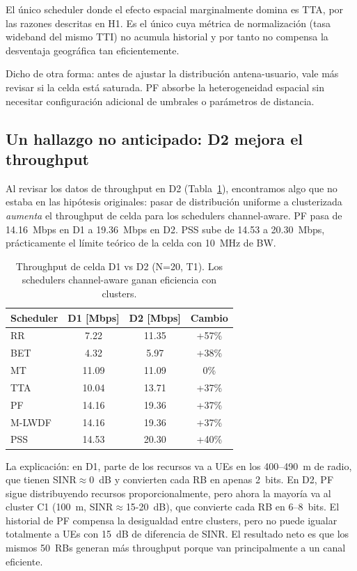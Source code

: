 \documentclass[conference]{IEEEtran}
\begin{document}
El único scheduler donde el efecto espacial marginalmente domina es TTA, por las
razones descritas en H1. Es el único cuya métrica de normalización (tasa wideband del
mismo TTI) no acumula historial y por tanto no compensa la desventaja geográfica tan
eficientemente.

Dicho de otra forma: antes de ajustar la distribución antena-usuario, vale más revisar
si la celda está saturada. PF absorbe la heterogeneidad espacial sin necesitar
configuración adicional de umbrales o parámetros de distancia.

\subsection{Un hallazgo no anticipado: D2 mejora el throughput}

Al revisar los datos de throughput en D2 (Tabla~\ref{tab:tput_d2}), encontramos algo
que no estaba en las hipótesis originales: pasar de distribución uniforme a clusterizada
\emph{aumenta} el throughput de celda para los schedulers channel-aware. PF pasa de
14.16~Mbps en D1 a 19.36~Mbps en D2. PSS sube de 14.53 a 20.30~Mbps, prácticamente
el límite teórico de la celda con 10~MHz de BW.

\begin{table}[t]
  \centering
  \caption{Throughput de celda D1 vs D2 (N=20, T1). Los schedulers channel-aware
           ganan eficiencia con clusters.}
  \label{tab:tput_d2}
  \footnotesize
  \begin{tabular}{@{}lccc@{}}
    \toprule
    \textbf{Scheduler} & \textbf{D1 [Mbps]} & \textbf{D2 [Mbps]} & \textbf{Cambio} \\
    \midrule
    RR     & 7.22  & 11.35 & +57\% \\
    BET    & 4.32  & 5.97  & +38\% \\
    MT     & 11.09 & 11.09 &   0\% \\
    TTA    & 10.04 & 13.71 & +37\% \\
    PF     & 14.16 & 19.36 & +37\% \\
    M-LWDF & 14.16 & 19.36 & +37\% \\
    PSS    & 14.53 & 20.30 & +40\% \\
    \bottomrule
  \end{tabular}
\end{table}

La explicación: en D1, parte de los recursos va a UEs en los 400--490~m de radio, que
tienen SINR$\approx$0~dB y convierten cada RB en apenas 2~bits. En D2, PF sigue
distribuyendo recursos proporcionalmente, pero ahora la mayoría va al cluster C1
(100~m, SINR$\approx$15-20~dB), que convierte cada RB en 6--8~bits. El historial de
PF compensa la desigualdad entre clusters, pero no puede igualar totalmente a UEs
con 15~dB de diferencia de SINR. El resultado neto es que los mismos 50~RBs generan
más throughput porque van principalmente a un canal eficiente.
\end{document}
